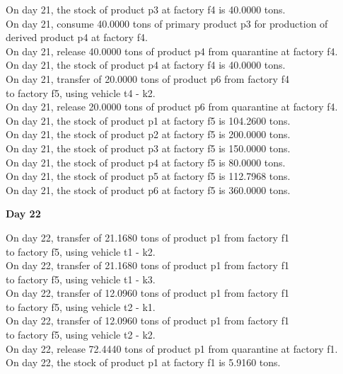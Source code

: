 \begin{table}[H]
\begin{multicols}{2}
\begin{tabbing}
On day 21, the stock of product p3 at factory f4 is 40.0000 tons. \\
On day 21, consume 40.0000 tons of primary product p3 for production of derived product p4 at factory f4. \\
On day 21, release 40.0000 tons of product p4 from quarantine at factory f4. \\
On day 21, the stock of product p4 at factory f4 is 40.0000 tons. \\
On day 21, transfer of 20.0000 tons of product p6 from factory f4 \\ to factory f5, using vehicle t4 - k2. \\
On day 21, release 20.0000 tons of product p6 from quarantine at factory f4. \\
On day 21, the stock of product p1 at factory f5 is 104.2600 tons. \\
On day 21, the stock of product p2 at factory f5 is 200.0000 tons. \\
On day 21, the stock of product p3 at factory f5 is 150.0000 tons. \\
On day 21, the stock of product p4 at factory f5 is 80.0000 tons. \\
On day 21, the stock of product p5 at factory f5 is 112.7968 tons. \\
On day 21, the stock of product p6 at factory f5 is 360.0000 tons. \\
\end{tabbing} \vspace{-2.0em}
\textbf{Day 22}
\vspace{-1.6em}
\begin{tabbing}
On day 22, transfer of 21.1680 tons of product p1 from factory f1 \\ to factory f5, using vehicle t1 - k2. \\
On day 22, transfer of 21.1680 tons of product p1 from factory f1 \\ to factory f5, using vehicle t1 - k3. \\
On day 22, transfer of 12.0960 tons of product p1 from factory f1 \\ to factory f5, using vehicle t2 - k1. \\
On day 22, transfer of 12.0960 tons of product p1 from factory f1 \\ to factory f5, using vehicle t2 - k2. \\
On day 22, release 72.4440 tons of product p1 from quarantine at factory f1. \\
On day 22, the stock of product p1 at factory f1 is 5.9160 tons. \\

\end{tabbing}
\end{multicols}
\end{table}
